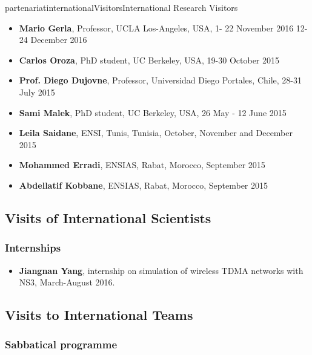 \documentclass{ra2016}
\begin{document}
\begin{module}{partenariat}{internationalVisitors}{International Research Visitors}
\begin{itemize}
     \item{\bf Mario Gerla}, Professor, UCLA Los-Angeles, USA, 1- 22 November 2016  12-24 December 2016
    \item{\bf Carlos Oroza}, PhD student, UC Berkeley, USA, 19-30 October 2015
    \item{\bf Prof. Diego Dujovne}, Professor, Universidad Diego Portales, Chile, 28-31 July 2015
    \item{\bf Sami Malek}, PhD student, UC Berkeley, USA, 26 May - 12 June 2015
    \item{\bf Leila Saidane}, ENSI, Tunis, Tunisia, October, November and December 2015 
    \item{\bf Mohammed Erradi}, ENSIAS, Rabat, Morocco, September 2015
    \item{\bf Abdellatif Kobbane}, ENSIAS, Rabat, Morocco, September 2015
\end{itemize}
\subsection{Visits of International Scientists}

   \subsubsection{Internships}

\begin{itemize}
    \item{\bf Jiangnan Yang}, internship on simulation of wireless TDMA networks with NS3, March-August 2016.
\end{itemize}



\subsection{Visits to International Teams}
   \subsubsection{Sabbatical programme}


\end{module}
\end{document}
